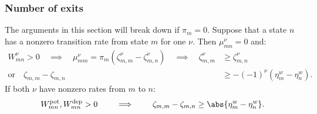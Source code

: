 \documentclass[12pt]{article}
\newcommand{\eqm}{\pi}
\newcommand{\etwm}{\eta^w}
\newcommand{\dgnm}{\zeta}
\newcommand{\Wm}{W}
\newcommand{\kktm}{\mu}
\newcommand{\pot}{^{\text{pot}}}
\newcommand{\dep}{^{\text{dep}}}
\begin{document}

\subsubsection{Number of exits}\label{sec:exit}

The arguments in this section will break down if \(\eqm_m = 0\).
Suppose that a state \(n\) has a nonzero transition rate from state \(m\) for one \(\nu\).
Then \(\kktm^\nu_{mn} = 0\) and:
%
\begin{equation}\label{eq:oneexit}
\begin{aligned}
  \Wm^\nu_{mn} > 0
  \quad \implies \quad
  \kktm^\nu_{mm} = \eqm_m (\dgnm^\nu_{m,m} - \dgnm^\nu_{m,n})
  \quad \implies \quad
  \dgnm^\nu_{m,m} &\geq \dgnm^\nu_{m,n} \\
  \text{or} \quad
  \dgnm_{m,m} - \dgnm_{m,n} &\geq - (-1)^\nu (\etwm_m - \etwm_n).
\end{aligned}
\end{equation}
%
If both \(\nu\) have nonzero rates from \(m\) to \(n\):
%
\begin{equation}\label{eq:doubleexit}
  \Wm\pot_{mn}, \Wm\dep_{mn} > 0
  \qquad \implies \qquad
  \dgnm_{m,m} - \dgnm_{m,n} \geq \abs{\etwm_m - \etwm_n}.
\end{equation}
%
\end{document}

